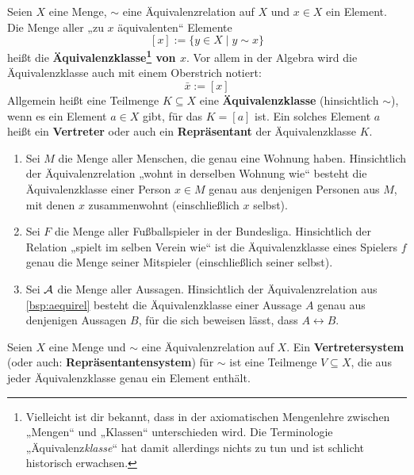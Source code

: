 \begin{defin}[Äquivalenzklasse] \label{def:aequiklasse}   
    Seien $X$ eine Menge, $\sim$ eine Äquivalenzrelation auf $X$ und $x\in X$ ein Element. Die Menge aller „zu $x$ äquivalenten“ Elemente
        \[ [x] := \{ y\in X \mid y\sim x \}\]
    heißt die \textbf{Äquivalenzklasse\footnote{Vielleicht ist dir bekannt, dass in der axiomatischen Mengenlehre zwischen „Mengen“ und „Klassen“ unterschieden wird. Die Terminologie „Äquivalenz\emph{klasse}“ hat damit allerdings nichts zu tun und ist schlicht historisch erwachsen.} von $x$}. Vor allem in der Algebra wird die Äquivalenzklasse auch mit einem Oberstrich notiert:
        \[ \bar x := [x]\]
    Allgemein heißt eine Teilmenge $K\subseteq X$ eine \textbf{Äquivalenzklasse} (hinsichtlich ${\sim}$), wenn es ein Element $a\in X$ gibt, für das $K=[a]$ ist. Ein solches Element $a$ heißt ein \textbf{Vertreter} oder auch ein \textbf{Repräsentant} der Äquivalenzklasse $K$.
\end{defin}


\begin{bsp} \quad
    \begin{enumerate}
        \item Sei $M$ die Menge aller Menschen, die genau eine Wohnung haben. Hinsichtlich der Äquivalenzrelation „wohnt in derselben Wohnung wie“ besteht die Äquivalenzklasse einer Person $x\in M$ genau aus denjenigen Personen aus $M$, mit denen $x$ zusammenwohnt (einschließlich $x$ selbst).
        \item Sei $F$ die Menge aller Fußballspieler in der Bundesliga. Hinsichtlich der Relation „spielt im selben Verein wie“ ist die Äquivalenzklasse eines Spielers $f$ genau die Menge seiner Mitspieler (einschließlich seiner selbst).
        \item Sei $\mathcal A$ die Menge aller Aussagen. Hinsichtlich der Äquivalenzrelation aus \cref{bsp:aequirel} besteht die Äquivalenzklasse einer Aussage $A$ genau aus denjenigen Aussagen $B$, für die sich beweisen lässt, dass $A\leftrightarrow B$.
    \end{enumerate}
\end{bsp}


\begin{defin}[* Vertretersystem]  
    Seien $X$ eine Menge und ${\sim}$ eine Äquivalenzrelation auf $X$. Ein \textbf{Vertretersystem}  (oder auch: \textbf{Repräsentantensystem}) für ${\sim}$ ist eine Teilmenge $V\subseteq X$, die aus jeder Äquivalenzklasse genau ein Element enthält.
\end{defin}


